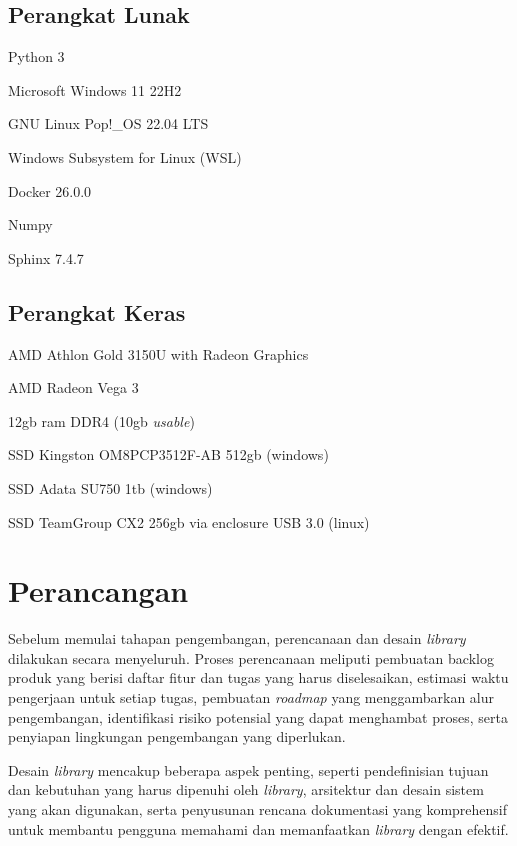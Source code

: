 \subsection{Perangkat Lunak}
\begin{packed_enum}
  \item Python 3
  \item Microsoft Windows 11 22H2
  \item GNU Linux Pop!\_OS 22.04 LTS
  \item Windows Subsystem for Linux (WSL)
  \item Docker 26.0.0
  \item Numpy
  \item Sphinx 7.4.7
\end{packed_enum}

\subsection{Perangkat Keras}
\begin{packed_enum}
  \item AMD Athlon Gold 3150U with Radeon Graphics
  \item AMD Radeon Vega 3
  \item 12gb ram DDR4 (10gb \textit{usable})
  \item SSD Kingston OM8PCP3512F-AB 512gb (windows)
  \item SSD Adata SU750 1tb (windows)
  \item SSD TeamGroup CX2 256gb via enclosure USB 3.0 (linux)
\end{packed_enum}

\section{Perancangan}
Sebelum memulai tahapan pengembangan, perencanaan dan desain \textit{library} dilakukan secara menyeluruh. Proses perencanaan meliputi pembuatan backlog produk yang berisi daftar fitur dan tugas yang harus diselesaikan, estimasi waktu pengerjaan untuk setiap tugas, pembuatan \textit{roadmap} yang menggambarkan alur pengembangan, identifikasi risiko potensial yang dapat menghambat proses, serta penyiapan lingkungan pengembangan yang diperlukan.

Desain \textit{library} mencakup beberapa aspek penting, seperti pendefinisian tujuan dan kebutuhan yang harus dipenuhi oleh \textit{library}, arsitektur dan desain sistem yang akan digunakan, serta penyusunan rencana dokumentasi yang komprehensif untuk membantu pengguna memahami dan memanfaatkan \textit{library} dengan efektif.

